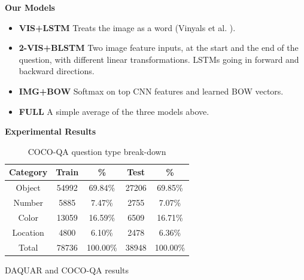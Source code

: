 \documentclass{beamer}
\renewcommand{\*}[1]{\textbf{#1}}
\begin{document}
\begin{frame}{}
\begin{columns}[T]
\begin{column}{0.32\linewidth}
\begin{block}{\bf{\large Our Models}}
\begin{itemize}
\item \*{VIS+LSTM} Treats the image as a word (Vinyals et al. \cite{vinyals14}).

\begin{figure}[t!]
\centering
\small
\scalebox{1.0}{
}
\label{fig:imgword}
\end{figure}

\item \*{2-VIS+BLSTM} Two image feature inputs, at the start and the end of the
question, with different linear transformations. LSTMs going in forward and
backward directions. 

\item \*{IMG+BOW} Softmax on top CNN features and learned BOW vectors.

\item \*{FULL} A simple average of the three models above.
\end{itemize}
\end{block}
\vfill

\begin{block}{\bf{\large Experimental Results}} 
\begin{table}[t!]
\caption{COCO-QA question type break-down}
\small
\label{tab:dataset_category_stats}
\begin{center}

\begin{tabular}{c c c c c}
\hline
Category & Train & \%       & Test  & \%       \\
\hline
Object   & 54992 & 69.84\%  & 27206 & 69.85\%  \\
Number   & 5885  & 7.47\%   & 2755  & 7.07\%   \\
Color    & 13059 & 16.59\%  & 6509  & 16.71\%  \\
Location & 4800  & 6.10\%   & 2478  & 6.36\%   \\
\hline
Total    & 78736 & 100.00\% & 38948 & 100.00\% \\
\hline
\end{tabular}

\end{center}
\end{table}
\vfill

\begin{table}[t!]
\caption{DAQUAR and COCO-QA results}
\small
\label{tab:daquar_results}
\begin{center}


\end{center}
\end{table}
\end{block}
\end{column}
\end{columns}
\end{frame}
\end{document}
